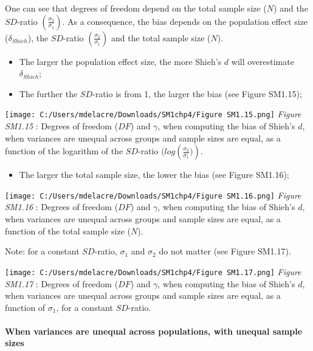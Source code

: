 \documentclass[
  english,
  man,mask,floatsintext]{apa6}
\providecommand{\tightlist}{%
  \setlength{\itemsep}{0pt}\setlength{\parskip}{0pt}}
\let\oldparagraph\paragraph
\renewcommand{\paragraph}[1]{\oldparagraph{#1}\mbox{}}
\begin{document}
One can see that degrees of freedom depend on the total sample size (\(N\)) and the \(SD\)-ratio \(\left( \frac{\sigma_2}{\sigma_1}\right)\). As a consequence, the bias depends on the population effect size (\(\delta_{Shieh}\)), the \(SD\)-ratio \(\left( \frac{\sigma_2}{\sigma_1}\right)\) and the total sample size (\(N\)).

\begin{itemize}
\item
  The larger the population effect size, the more Shieh's \(d\) will overestimate \(\delta_{Shieh}\);
\item
  The further the \(SD\)-ratio is from 1, the larger the bias (see Figure SM1.15);
\end{itemize}

\texttt{[image: C:/Users/mdelacre/Downloads/SM1chp4/Figure SM1.15.png]}
\emph{Figure SM1.15} : Degrees of freedom (\(DF\)) and \(\gamma\), when computing the bias of Shieh's \(d\), when variances are unequal across groups and sample sizes are equal, as a function of the logarithm of the \(SD\)-ratio \((log \left(\frac{\sigma_2}{\sigma_1})\right)\).

\begin{itemize}
\tightlist
\item
  The larger the total sample size, the lower the bias (see Figure SM1.16);
\end{itemize}

\texttt{[image: C:/Users/mdelacre/Downloads/SM1chp4/Figure SM1.16.png]}
\emph{Figure SM1.16} : Degrees of freedom (\(DF\)) and \(\gamma\), when computing the bias of Shieh's \(d\), when variances are unequal across groups and sample sizes are equal, as a function of the total sample size (\(N\)).

Note: for a constant \(SD\)-ratio, \(\sigma_1\) and \(\sigma_2\) do not matter (see Figure SM1.17).

\texttt{[image: C:/Users/mdelacre/Downloads/SM1chp4/Figure SM1.17.png]}
\emph{Figure SM1.17} : Degrees of freedom (\(DF\)) and \(\gamma\), when computing the bias of Shieh's \(d\), when variances are unequal across groups and sample sizes are equal, as a function of \(\sigma_1\), for a constant \(SD\)-ratio.

\hypertarget{when-variances-are-unequal-across-populations-with-unequal-sample-sizes-1}{%
\paragraph{When variances are unequal across populations, with unequal sample sizes}\label{when-variances-are-unequal-across-populations-with-unequal-sample-sizes-1}}
\end{document}
